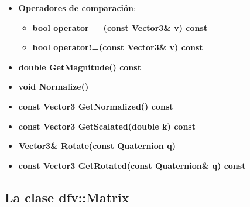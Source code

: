 \documentclass[12pt, a4paper]{report}
\begin{document}
\begin{itemize}
\item \textbf{Operadores de comparación}:

\begin{itemize}
\item \textbf{bool operator==(const Vector3\& v) const}
\item \textbf{bool operator!=(const Vector3\& v) const}
\end{itemize}

\item \textbf{double GetMagnitude() const}
\item \textbf{void Normalize()}
\item \textbf{const Vector3 GetNormalized() const}
\item \textbf{const Vector3 GetScalated(double k) const}
\item \textbf{Vector3\& Rotate(const Quaternion q)}
\item \textbf{const Vector3 GetRotated(const Quaternion\& q) const}

\end{itemize}

\subsection{La clase dfv::Matrix}
\end{document}
